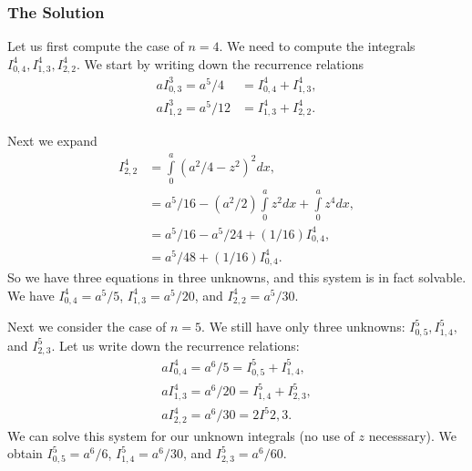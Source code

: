 \subsubsection*{The Solution}

Let us first compute the case of \(n = 4\). We need to compute the integrals \(I^4_{0, 4}, I^4_{1, 3}, I^4_{2, 2}\).
We start by writing down the recurrence relations
\begin{align}
a I^3_{0, 3} = a^5 / 4 & = I^4_{0, 4} + I^4_{1, 3}, \\
a I^3_{1, 2} = a^5 / 12 & = I^4_{1, 3} + I^4_{2, 2}.
\end{align}

Next we expand
\begin{align}
I^4_{2, 2} & = \int\limits_0^a (a^2 / 4 - z^2)^2 dx, \\
    & = a^5 / 16 - (a^2 / 2) \int\limits_0^a z^2 dx + \int\limits_0^a z^4 dx, \\
    & = a^5 / 16 - a^5 / 24 + (1/16)I^4_{0, 4}, \\
    & = a^5 / 48 + (1/16)I^4_{0, 4}.
\end{align}
So we have three equations in three unknowns, and this system is in fact solvable. We have \(I^4_{0, 4} = a^5/5\),
\(I^4_{1, 3} = a^5 / 20\), and \(I^4_{2, 2} = a^5 / 30\).

Next we consider the case of \(n = 5\). We still have only three unknowns: \(I^5_{0, 5}, I^5_{1, 4},\) and
\(I^5_{2, 3}\). Let us write down the recurrence relations:
\begin{align}
a I^4_{0, 4} = a^6 / 5 = I^5_{0, 5} + I^5_{1, 4}, \\
a I^4_{1, 3} = a^6 / 20 = I^5_{1, 4} + I^5_{2, 3}, \\
a I^4_{2, 2} = a^6 / 30 = 2 I^5{2, 3}. 
\end{align} 
We can solve this system for our unknown integrals (no use of \(z\) necesssary). We obtain
\(I^5_{0, 5} = a^6 / 6\), \(I^5_{1, 4} = a^6 / 30\), and \(I^5_{2, 3} = a^6 / 60\).

